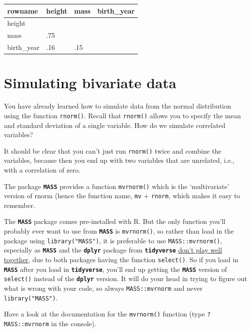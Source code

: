 \documentclass[]{book}
\begin{document}
\begin{tabular}{l|l|l|l}
\hline
rowname & height & mass & birth\_year\\
\hline
height &  &  & \\
\hline
mass & .75 &  & \\
\hline
birth\_year & .16 & .15 & \\
\hline
\end{tabular}

\hypertarget{simulating-bivariate-data}{%
\section{Simulating bivariate data}\label{simulating-bivariate-data}}

You have already learned how to simulate data from the normal distribution using the function \texttt{rnorm()}. Recall that \texttt{rnorm()} allows you to specify the mean and standard deviation of a single variable. How do we simulate correlated variables?

It should be clear that you can't just run \texttt{rnorm()} twice and combine the variables, because then you end up with two variables that are unrelated, i.e., with a correlation of zero.

The package \textbf{\texttt{MASS}} provides a function \texttt{mvrnorm()} which is the `multivariate' version of rnorm (hence the function name, \texttt{mv} + \texttt{rnorm}, which makes it easy to remember.

The \textbf{\texttt{MASS}} package comes pre-installed with R. But the only function you'll probably ever want to use from \textbf{\texttt{MASS}} is \texttt{mvrnorm()}, so rather than load in the package using \texttt{library("MASS")}, it is preferable to use \texttt{MASS::mvrnorm()}, especially as \textbf{\texttt{MASS}} and the \textbf{\texttt{dplyr}} package from \textbf{\texttt{tidyverse}} \href{https://twitter.com/dalejbarr/status/516986671129452544?s=20}{don't play well together}, due to both packages having the function \texttt{select()}. So if you load in \textbf{\texttt{MASS}} after you load in \textbf{\texttt{tidyverse}}, you'll end up getting the \textbf{\texttt{MASS}} version of \texttt{select()} instead of the \textbf{\texttt{dplyr}} version. It will do your head in trying to figure out what is wrong with your code, so always \texttt{MASS::mvrnorm} and never \texttt{library("MASS")}.

Have a look at the documentation for the \texttt{mvrnorm()} function (type \texttt{?MASS::mvrnorm} in the console).
\end{document}
